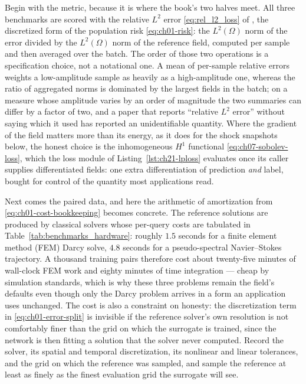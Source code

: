 Begin with the metric, because it is where the book's two halves meet. All three
benchmarks are scored with the relative $L^{2}$ error
\eqref{eq:rel_l2_loss} of
, the discretized
form of the population risk \eqref{eq:ch01-risk}: the $L^{2}(\Omega)$ norm of the
error divided by the $L^{2}(\Omega)$ norm of the reference field, computed per
sample and then averaged over the batch. The order of those two operations is a
specification choice, not a notational one. A mean of per-sample relative errors
weights a low-amplitude sample as heavily as a high-amplitude one, whereas the
ratio of aggregated norms is dominated by the largest fields in the batch; on a
measure whose amplitude varies by an order of magnitude the two summaries can
differ by a factor of two, and a paper that reports ``relative $L^{2}$ error''
without saying which it used has reported an unidentifiable quantity. Where the
gradient of the field matters more than its energy, as it does for the shock
snapshots below, the honest choice is the inhomogeneous $H^{1}$ functional
\eqref{eq:ch07-sobolev-loss}, which the loss module of
Listing~\ref{lst:ch21-lploss} evaluates once its caller supplies differentiated
fields: one extra differentiation of prediction \emph{and} label, bought for control
of the quantity most applications read.

Next comes the paired data, and here the arithmetic of amortization from
\eqref{eq:ch01-cost-bookkeeping} becomes concrete. The reference solutions are
produced by classical solvers whose per-query costs are tabulated in
Table~\ref{tab:benchmarks_hardware}: roughly $1.5$ seconds for a finite element
method (FEM) Darcy solve, $4.8$ seconds for a pseudo-spectral Navier--Stokes
trajectory. A thousand training pairs therefore cost about twenty-five minutes of
wall-clock FEM work and eighty minutes of time integration --- cheap by simulation
standards, which is why these three problems remain the field's defaults even
though only the Darcy problem arrives in a form an application uses unchanged. The
cost is also a constraint on
honesty: the discretization term in \eqref{eq:ch01-error-split} is invisible if
the reference solver's own resolution is not comfortably finer than the grid on
which the surrogate is trained, since the network is then fitting a solution that
the solver never computed. Record the solver, its spatial and temporal
discretization, its nonlinear and linear tolerances, and the grid on which the
reference was sampled, and sample the reference at least as finely as the finest
evaluation grid the surrogate will see.

